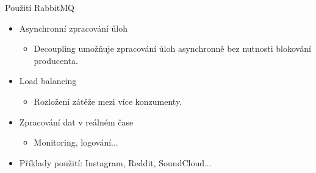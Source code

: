 \documentclass{beamer}
\begin{document}
\begin{frame}{Použití RabbitMQ}
	\begin{itemize}
		\item Asynchronní zpracování úloh
		\begin{itemize}
			\item [\textendash] Decoupling umožňuje zpracování úloh asynchronně bez nutnosti blokování producenta.
		\end{itemize}
		\item Load balancing
		\begin{itemize}
			\item [\textendash] Rozložení zátěže mezi více konzumenty.
		\end{itemize}
		\item Zpracování dat v reálném čase
		\begin{itemize}
			\item [\textendash] Monitoring, logování...
		\end{itemize}
		\item Příklady použití: Instagram, Reddit, SoundCloud...
	\end{itemize}
\end{frame}
\end{document}
